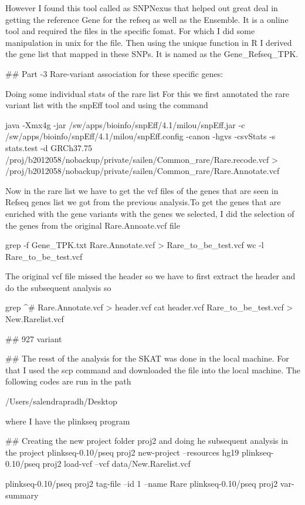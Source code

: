  However I found this tool called as SNPNexus that helped out great deal in getting the reference Gene for the refseq as well as the Ensemble. It is a online tool and required the files in the specific fomat. For which I did some manipulation in unix for the file. Then using the unique function in R I derived the gene list that mapped in these SNPs. It is named as the Gene_Refseq_TPK.
 
 ## Part -3 Rare-variant association for these specific genes:
 
 Doing some individual stats of the rare list
 For this we first annotated the rare variant list with the snpEff tool and using the command
 
 java -Xmx4g -jar /sw/apps/bioinfo/snpEff/4.1/milou/snpEff.jar -c /sw/apps/bioinfo/snpEff/4.1/milou/snpEff.config  -canon -hgvs -csvStats -s stats.test -d  GRCh37.75  /proj/b2012058/nobackup/private/sailen/Common_rare/Rare.recode.vcf  > /proj/b2012058/nobackup/private/sailen/Common_rare/Rare.Annotate.vcf
 
 Now in the rare list we have to get the vcf files of the genes that are seen in Refseq genes list we got from the previous analysis.To get the genes that are enriched with the gene variants with the genes we selected, I did the selection of the genes from the original Rare.Annoate.vcf file
 
 grep -f Gene_TPK.txt Rare.Annotate.vcf > Rare_to_be_test.vcf
 wc -l Rare_to_be_test.vcf 
 
 The original vcf file missed the header so we have to first extract the header and do the subsequent analysis so
 
 grep ^# Rare.Annotate.vcf > header.vcf
 cat header.vcf Rare_to_be_test.vcf > New.Rarelist.vcf
 
 
 ## 927 variant 
 
 
 ## The resst of the analysis for the SKAT was done in the local machine. For that I used the scp command and downloaded the file into the local machine. The following codes are run in the path
 
/Users/salendrapradh/Desktop 

where I have the plinkseq program 

## Creating the new project folder proj2 and doing he subsequent analysis in the project
plinkseq-0.10/pseq proj2 new-project --resources hg19
plinkseq-0.10/pseq proj2 load-vcf --vcf data/New.Rarelist.vcf 

plinkseq-0.10/pseq proj2 tag-file --id 1  --name Rare
plinkseq-0.10/pseq proj2 var-summary 

